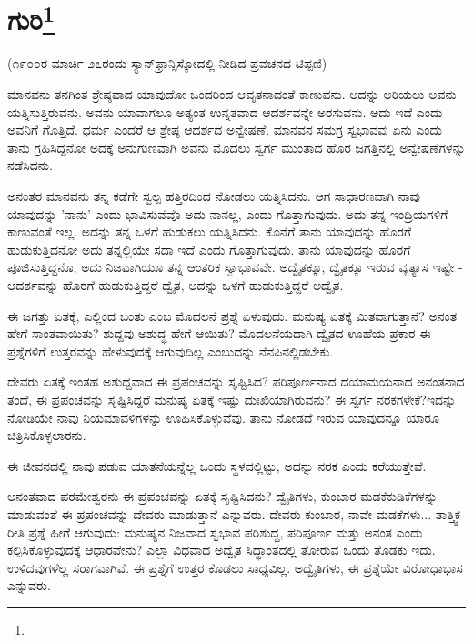 
\chapter{ಗುರಿ\protect\footnote{}}

\begin{center}
(೧೯೦೦ರ ಮಾರ್ಚಿ ೨೭ರಂದು ಸ್ಯಾನ್‌ಫ್ರಾನ್ಸಿಸ್ಕೋದಲ್ಲಿ ನೀಡಿದ ಪ್ರವಚನದ ಟಿಪ್ಪಣಿ)
\end{center}

ಮಾನವನು ತನಗಿಂತ ಶ್ರೇಷ್ಠವಾದ ಯಾವುದೋ ಒಂದರಿಂದ ಆವೃತನಾದಂತೆ ಕಾಣುವನು. ಅದನ್ನು ಅರಿಯಲು ಅವನು ಯತ್ನಿಸುತ್ತಿರುವನು. ಅವನು ಯಾವಾಗಲೂ ಅತ್ಯಂತ ಉನ್ನತವಾದ ಆದರ್ಶವನ್ನೇ ಅರಸುವನು. ಅದು ಇದೆ ಎಂದು ಅವನಿಗೆ ಗೊತ್ತಿದೆ. ಧರ್ಮ ಎಂದರೆ ಆ ಶ್ರೇಷ್ಠ ಆದರ್ಶದ ಅನ್ವೇಷಣೆ. ಮಾನವನ ಸಮಗ್ರ ಸ್ವಭಾವವು ಏನು ಎಂದು ತಾನು ಗ್ರಹಿಸಿದ್ದನೋ ಅದಕ್ಕೆ ಅನುಗುಣವಾಗಿ ಅವನು ಮೊದಲು ಸ್ವರ್ಗ ಮುಂತಾದ ಹೊರ ಜಗತ್ತಿನಲ್ಲಿ ಅನ್ವೇಷಣೆಗಳನ್ನು ನಡೆಸಿದನು.

ಅನಂತರ ಮಾನವನು ತನ್ನ ಕಡೆಗೇ ಸ್ವಲ್ಪ ಹತ್ತಿರದಿಂದ ನೋಡಲು ಯತ್ನಿಸಿದನು. ಆಗ ಸಾಧಾರಣವಾಗಿ ನಾವು ಯಾವುದನ್ನು 'ನಾನು' ಎಂದು ಭಾವಿಸುವೆವೊ ಅದು ನಾನಲ್ಲ, ಎಂದು ಗೊತ್ತಾಗುವುದು. ಅದು ತನ್ನ ಇಂದ್ರಿಯಗಳಿಗೆ ಕಾಣುವಂತೆ ಇಲ್ಲ. ಅದನ್ನು ತನ್ನ ಒಳಗೆ ಹುಡುಕಲು ಯತ್ನಿಸಿದನು. ಕೊನೆಗೆ ತಾನು ಯಾವುದನ್ನು ಹೊರಗೆ ಹುಡುಕುತ್ತಿದನೋ ಅದು ತನ್ನಲ್ಲಿಯೇ ಸದಾ ಇದೆ ಎಂದು ಗೊತ್ತಾಗುವುದು. ತಾನು ಯಾವುದನ್ನು ಹೊರಗೆ ಪೂಜಿಸುತ್ತಿದ್ದನೊ, ಅದು ನಿಜವಾಗಿಯೂ ತನ್ನ ಆಂತರಿಕ ಸ್ವಾಭಾವವೇ. ಅದ್ವೈತಕ್ಕೂ, ದ್ವೈತಕ್ಕೂ ಇರುವ ವ್ಯತ್ಯಾಸ ಇಷ್ಟೇ - ಆದರ್ಶವನ್ನು ಹೊರಗೆ ಹುಡುಕುತ್ತಿದ್ದರೆ ದ್ವೈತ, ಅದನ್ನು ಒಳಗೆ ಹುಡುಕುತ್ತಿದ್ದರೆ ಅದ್ವೈತ.

ಈ ಜಗತ್ತು ಏತಕ್ಕೆ, ಎಲ್ಲಿಂದ ಬಂತು ಎಂಬ ಮೊದಲನೆ ಪ್ರಶ್ನೆ ಏಳುವುದು. ಮನುಷ್ಯ ಏತಕ್ಕೆ ಮಿತವಾಗುತ್ತಾನೆ? ಅನಂತ ಹೇಗೆ ಸಾಂತವಾಯಿತು? ಶುದ್ದವು ಅಶುದ್ಧ ಹೇಗೆ ಆಯಿತು? ಮೊದಲನೆಯದಾಗಿ ದ್ವೈತದ ಊಹೆಯ ಪ್ರಕಾರ ಈ ಪ್ರಶ್ನೆಗಳಿಗೆ ಉತ್ತರವನ್ನು ಹೇಳುವುದಕ್ಕೆ ಆಗುವುದಿಲ್ಲ ಎಂಬುದನ್ನು ನೆನಪಿನಲ್ಲಿಡಬೇಕು.

ದೇವರು ಏತಕ್ಕೆ ಇಂತಹ ಅಶುದ್ದವಾದ ಈ ಪ್ರಪಂಚವನ್ನು ಸೃಷ್ಟಿಸಿದ? ಪರಿಪೂರ್ಣನಾದ ದಯಾಮಯನಾದ ಅನಂತನಾದ ತಂದೆ, ಈ ಪ್ರಪಂಚವನ್ನು ಸೃಷ್ಟಿಸಿದ್ದರೆ ಮನುಷ್ಯ ಏತಕ್ಕೆ ಇಷ್ಟು ದುಃಖಿಯಾಗಿರುವನು? ಈ ಸ್ವರ್ಗ ನರಕಗಳೇಕೆ?ಇದನ್ನು ನೋಡಿಯೇ ನಾವು ನಿಯಮಾವಳಿಗಳನ್ನು ಊಹಿಸಿಕೊಳ್ಳುವೆವು. ತಾನು ನೋಡದೆ ಇರುವ ಯಾವುದನ್ನೂ ಯಾರೂ ಚಿತ್ರಿಸಿಕೊಳ್ಳಲಾರನು.

ಈ ಜೀವನದಲ್ಲಿ ನಾವು ಪಡುವ ಯಾತನೆಯನ್ನೆಲ್ಲ ಒಂದು ಸ್ಥಳದಲ್ಲಿಟ್ಟು, ಅದನ್ನು ನರಕ ಎಂದು ಕರೆಯುತ್ತೇವೆ.

ಅನಂತವಾದ ಪರಮೇಶ್ವರನು ಈ ಪ್ರಪಂಚವನ್ನು ಏತಕ್ಕೆ ಸೃಷ್ಟಿಸಿದನು? ದ್ವೈತಿಗಳು, ಕುಂಬಾರ ಮಡಕೆಕುಡಿಕೆಗಳನ್ನು ಮಾಡುವಂತೆ ಈ ಪ್ರಪಂಚವನ್ನು ದೇವರು ಮಾಡುತ್ತಾನೆ ಎನ್ನುವರು. ದೇವರು ಕುಂಬಾರ, ನಾವೇ ಮಡಕೆಗಳು... ತಾತ್ತ್ವಿಕ ರೀತಿ ಪ್ರಶ್ನೆ ಹೀಗೆ ಆಗುವುದು: ಮನುಷ್ಯನ ನಿಜವಾದ ಸ್ವಭಾವ ಪರಿಶುದ್ಧ, ಪರಿಪೂರ್ಣ ಮತ್ತು ಅನಂತ ಎಂದು ಕಲ್ಪಿಸಿಕೊಳ್ಳುವುದಕ್ಕೆ ಆಧಾರವೇನು? ಎಲ್ಲಾ ವಿಧವಾದ ಅದ್ವೈತ ಸಿದ್ಧಾಂತದಲ್ಲಿ ತೋರುವ ಒಂದು ತೊಡಕು ಇದು. ಉಳಿದವುಗಳೆಲ್ಲ ಸರಾಗವಾಗಿವೆ. ಈ ಪ್ರಶ್ನೆಗೆ ಉತ್ತರ ಕೊಡಲು ಸಾಧ್ಯವಿಲ್ಲ. ಅದ್ವೈತಿಗಳು, ಈ ಪ್ರಶ್ನೆಯೇ ವಿರೋಧಾಭಾಸ ಎನ್ನುವರು.

